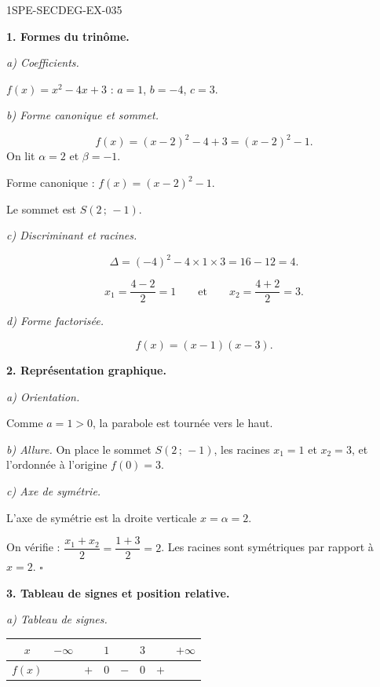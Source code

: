 \begin{corrige}{1SPE-SECDEG-EX-035}

\textbf{1. Formes du trinôme.}

\textit{a) Coefficients.}


$f(x) = x^2 - 4x + 3$ : $a = 1$, $b = -4$, $c = 3$.

\textit{b) Forme canonique et sommet.}


\[f(x)=(x-2)^2-4+3=(x-2)^2-1.\]
On lit $\alpha=2$ et $\beta=-1$.

Forme canonique : $f(x) = (x - 2)^2 - 1$.

Le sommet est $S(2\,;\,-1)$.

\textit{c) Discriminant et racines.}

\[\Delta = (-4)^2 - 4 \times 1 \times 3 = 16 - 12 = 4.\]

\[x_1 = \frac{4 - 2}{2} = 1 \qquad \text{et} \qquad x_2 = \frac{4 + 2}{2} = 3.\]

\textit{d) Forme factorisée.}

\[f(x) = (x - 1)(x - 3).\]

\medskip
\textbf{2. Représentation graphique.}

\textit{a) Orientation.}


Comme $a = 1 > 0$, la parabole est tournée vers le haut.

\textit{b) Allure.} On place le sommet $S(2\,;\,-1)$, les racines $x_1 = 1$ et $x_2 = 3$, et l'ordonnée à l'origine $f(0) = 3$.

\textit{c) Axe de symétrie.}

L'axe de symétrie est la droite verticale $x = \alpha = 2$.

On vérifie : $\dfrac{x_1 + x_2}{2} = \dfrac{1 + 3}{2} = 2$. Les racines sont symétriques par rapport à $x = 2$. \hfill $\square$

\medskip
\textbf{3. Tableau de signes et position relative.}

\textit{a) Tableau de signes.}


\medskip
\begin{center}
\begin{tabular}{|c|ccccccc|}
\hline
$x$ & $-\infty$ & & $1$ & & $3$ & & $+\infty$ \\
\hline
$f(x)$ & & $+$ & $0$ & $-$ & $0$ & $+$ & \\
\hline
\end{tabular}
\end{center}


\end{corrige}
